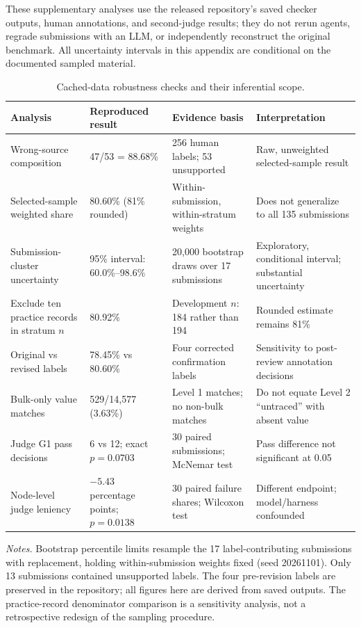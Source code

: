 \documentclass[preprint,12pt,authoryear]{elsarticle}
\begin{document}
These supplementary analyses use the released repository's saved checker outputs, human annotations, and second-judge results; they do not rerun agents, regrade submissions with an LLM, or independently reconstruct the original benchmark. All uncertainty intervals in this appendix are conditional on the documented sampled material.

\begin{table}[!htbp]
\centering
\caption{Cached-data robustness checks and their inferential scope.}
\label{tab:repro-checks}
\footnotesize
\setlength{\tabcolsep}{3pt}
\begin{tabular}{@{}>{\raggedright}p{3.0cm}>{\raggedright}p{3.0cm}>{\raggedright}p{3.3cm}>{\raggedright\arraybackslash}p{3.7cm}@{}}
\toprule
Analysis & Reproduced result & Evidence basis & Interpretation\\
\midrule
Wrong-source composition & 47/53 = 88.68\% & 256 human labels; 53 unsupported & Raw, unweighted selected-sample result\\
Selected-sample weighted share & 80.60\% (81\% rounded) & Within-submission, within-stratum weights & Does not generalize to all 135 submissions\\
Submission-cluster uncertainty & 95\% interval: 60.0\%--98.6\% & 20,000 bootstrap draws over 17 submissions & Exploratory, conditional interval; substantial uncertainty\\
Exclude ten practice records in stratum $n$ & 80.92\% & Development $n$: 184 rather than 194 & Rounded estimate remains 81\%\\
Original vs revised labels & 78.45\% vs 80.60\% & Four corrected confirmation labels & Sensitivity to post-review annotation decisions\\
Bulk-only value matches & 529/14,577 (3.63\%) & Level 1 matches; no non-bulk matches & Do not equate Level 2 ``untraced'' with absent value\\
Judge G1 pass decisions & 6 vs 12; exact $p=0.0703$ & 30 paired submissions; McNemar test & Pass difference not significant at 0.05\\
Node-level judge leniency & $-5.43$ percentage points; $p=0.0138$ & 30 paired failure shares; Wilcoxon test & Different endpoint; model/harness confounded\\
\bottomrule
\end{tabular}

\par\smallskip
{\footnotesize\raggedright \textit{Notes.} Bootstrap percentile limits resample the 17 label-contributing submissions with replacement, holding within-submission weights fixed (seed 20261101). Only 13 submissions contained unsupported labels. The four pre-revision labels are preserved in the repository; all figures here are derived from saved outputs. The practice-record denominator comparison is a sensitivity analysis, not a retrospective redesign of the sampling procedure.\par}
\end{table}
\end{document}
